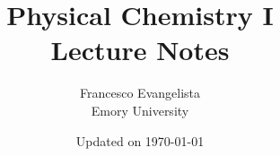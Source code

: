 \documentclass{../Main/lecturenotes}
\title{\Huge  Physical Chemistry I \\ Lecture Notes \vspace{1in}}
\author{{\LARGE Francesco Evangelista} \vspace{.125in} \\ Emory University \vspace{5.5in}}
\date{Updated on \today}
\begin{document}
\maketitle

\pagebreak

\tableofcontents

\pagebreak



\pagebreak
\graphicspath{{../02-BohrModel/}}


\pagebreak


\pagebreak
\graphicspath{{../04-SchrodingerEquation/}}


\pagebreak
\graphicspath{{../05-Operators/}}


\pagebreak
\graphicspath{{../06-Particle1DBox/}}


\pagebreak
\graphicspath{{../07-ExpectationValue/}}


\pagebreak
\graphicspath{{../08-Superpositions/}}


\pagebreak
\graphicspath{{../09-HarmonicOscillator/}}


\pagebreak
\graphicspath{{../10-VibrationsDiatomics/}}


\pagebreak
\graphicspath{{../11-Particle3DBox/}}


\pagebreak
\graphicspath{{../12-RigidRotor/}}


\pagebreak
\graphicspath{{../13-HydrogenAtom/}}


\pagebreak
\graphicspath{{../14-ManyElectronAtoms/}}

\end{document}
